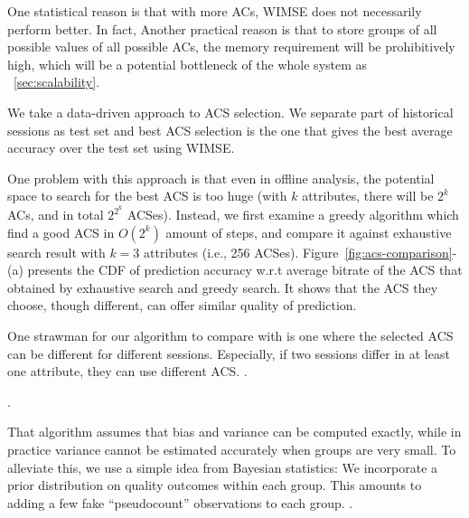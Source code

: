  One statistical reason is that with more ACs, WIMSE does not necessarily perform better. In fact,  Another practical reason is that to store groups of all possible values of all possible ACs, the memory requirement will be prohibitively high, which will be a potential bottleneck of the whole system as \Section~\ref{sec:scalability}. 

 We take a data-driven approach to ACS selection. We separate part of historical sessions as test set and best ACS selection is the one that gives the best average accuracy over the test set using WIMSE. 

 One problem with this approach is that even in offline analysis, the potential space to search for the best ACS is too huge (with $k$ attributes, there will be $2^k$ ACs, and in total $2^{2^k}$ ACSes). Instead, we first examine a greedy algorithm which find a good ACS in $O(2^k)$ amount of steps, and compare it against exhaustive search result with $k=3$ attributes (i.e., 256 ACSes). Figure~\ref{fig:acs-comparison}-(a) presents the CDF of prediction accuracy w.r.t average bitrate of the ACS that obtained by exhaustive search and greedy search. It shows that the ACS they choose, though different, can offer similar quality of prediction.


 One strawman for our algorithm to compare with is one where the selected ACS can be different for different sessions. Especially, if two sessions differ in at least one attribute, they can use different ACS. \fillme. 

 \fillme. 

That algorithm assumes that bias and variance can be computed exactly, while in practice variance cannot be estimated accurately when groups are very small.  To alleviate this, we use a simple idea from Bayesian statistics: We incorporate a prior distribution on quality outcomes within each group.  This amounts to adding a few fake ``pseudocount'' observations to each group.  \fillme.


